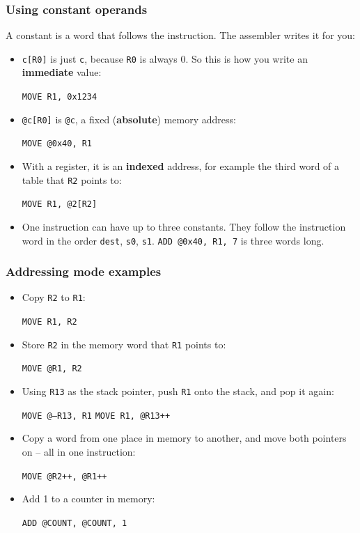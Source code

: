 \documentclass{beamer}
\newcommand{\code}[1]{\texttt{#1}}
\begin{document}
   \begin{frame}
    \frametitle{Using constant operands}
    A constant is a word that follows the instruction. The assembler
    writes it for you:
    \begin{itemize}
     \item \code{c[R0]} is just \code{c}, because \code{R0} is always 0.
      So this is how you write an \textbf{immediate} value:
      \begin{center}
       \code{MOVE R1, 0x1234}
      \end{center}
     \item \code{@c[R0]} is \code{@c}, a fixed (\textbf{absolute})
      memory address:
      \begin{center}
       \code{MOVE @0x40, R1}
      \end{center}
     \item With a register, it is an \textbf{indexed} address, for example
      the third word of a table that \code{R2} points to:
      \begin{center}
       \code{MOVE R1, @2[R2]}
      \end{center}
     \item One instruction can have up to three constants. They follow the
      instruction word in the order \code{dest}, \code{s0}, \code{s1}.
      \code{ADD @0x40, R1, 7} is three words long.
    \end{itemize}
   \end{frame}
%
   \begin{frame}
    \frametitle{Addressing mode examples}
    \begin{itemize}
     \item Copy \code{R2} to \code{R1}:
      \begin{center}
       \code{MOVE R1, R2}
      \end{center}
     \item Store \code{R2} in the memory word that \code{R1} points to:
      \begin{center}
       \code{MOVE @R1, R2}
      \end{center}
     \item Using \code{R13} as the stack pointer, push \code{R1} onto the
      stack, and pop it again:
      \begin{center}
       \code{MOVE @--R13, R1} \qquad \code{MOVE R1, @R13++}
      \end{center}
     \item Copy a word from one place in memory to another, and move both
      pointers on -- all in one instruction:
      \begin{center}
       \code{MOVE @R2++, @R1++}
      \end{center}
     \item Add 1 to a counter in memory:
      \begin{center}
       \code{ADD @COUNT, @COUNT, 1}
      \end{center}
    \end{itemize}
   \end{frame}
\end{document}
